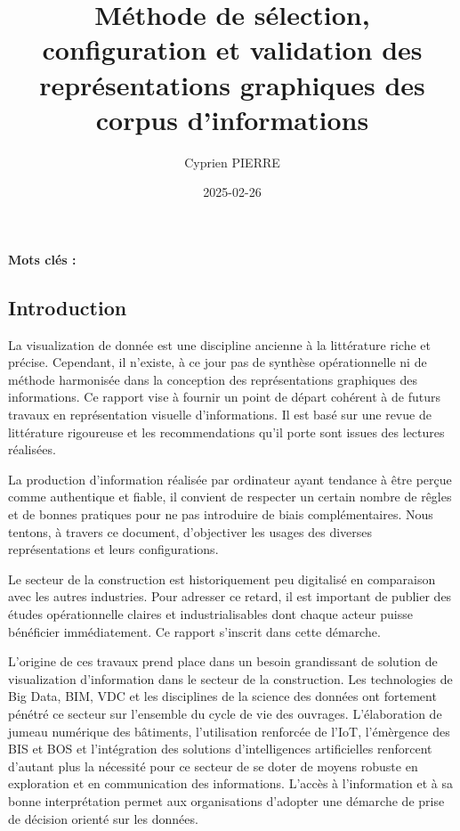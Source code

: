 \documentclass[a4paper,12pt]{article}
\author{Cyprien PIERRE \orcidlink{0009-0009-9040-6795}}
\date{2025-02-26}
\title{Méthode de sélection, configuration et validation des représentations graphiques des corpus d'informations}
\begin{document}
\maketitle
\begin{abstract}
\end{abstract}

\renewcommand\{\keywordsname\{\textbf{Mots clés : }

\begin{multicols}{2}
\section*{Introduction}
\label{sec:org611a106}
La visualization de donnée est une discipline ancienne à la littérature riche et précise. Cependant, il n'existe, à ce jour pas de synthèse opérationnelle ni de méthode harmonisée dans la conception des représentations graphiques des informations. Ce rapport vise à fournir un point de départ cohérent à de futurs travaux en représentation visuelle d'informations. Il est basé sur une revue de littérature rigoureuse et les recommendations qu'il porte sont issues des lectures réalisées.

La production d'information réalisée par ordinateur ayant tendance à être perçue comme authentique et fiable, \autocite{stephenfewIntroduction2012} il convient de respecter un certain nombre de rêgles et de bonnes pratiques pour ne pas introduire de biais complémentaires. Nous tentons, à travers ce document, d'objectiver les usages des diverses représentations et leurs configurations.

Le secteur de la construction est historiquement peu digitalisé en comparaison avec les autres industries.\autocite{safurazabidinBibliometricScientometricMapping2020} Pour adresser ce retard, il est important de publier des études opérationnelle claires et industrialisables dont chaque acteur puisse bénéficier immédiatement. Ce rapport s'inscrit dans cette démarche.

L'origine de ces travaux prend place dans un besoin grandissant de solution de visualization d'information dans le secteur de la construction. Les technologies de Big Data, BIM, VDC et les disciplines de la science des données ont fortement pénétré ce secteur sur l'ensemble du cycle de vie des ouvrages. \autocite{asiauniversitytaichungtaiwanResearchApplicationFunctiontechnologyaesthetics2020} L'élaboration de jumeau numérique des bâtiments, l'utilisation renforcée de l'IoT, l'émèrgence des BIS et BOS et l'intégration des solutions d'intelligences artificielles renforcent d'autant plus la nécessité pour ce secteur de se doter de moyens robuste en exploration et en communication des informations.
L'accès à l'information et à sa bonne interprétation permet aux organisations d'adopter une démarche de prise de décision orienté sur les données. \autocite{sosulskiDataVisualizationMade2019}  



\end{multicols}
\end{document}
